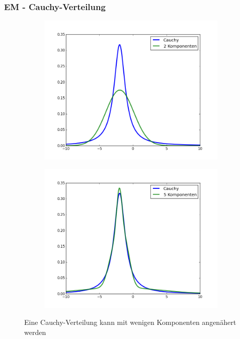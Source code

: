 \documentclass[11pt]{beamer}
\begin{document}
\begin{frame}
  \frametitle{EM - Cauchy-Verteilung}
  \begin{figure}[h]
  \centering
  \begin{subfigure}{0.45\textwidth}
    \centering
    \includegraphics[width=\textwidth]{presentation/cauchy-2-components}
  \end{subfigure}
  \hfill
  \begin{subfigure}{0.45\textwidth}
    \centering
    \includegraphics[width=\textwidth]{presentation/cauchy-5-components}
  \end{subfigure}
  \caption{Eine Cauchy-Verteilung kann mit wenigen Komponenten angenähert werden}
  \label{fig:em-cauchy}
\end{figure}
\end{frame}
\end{document}
